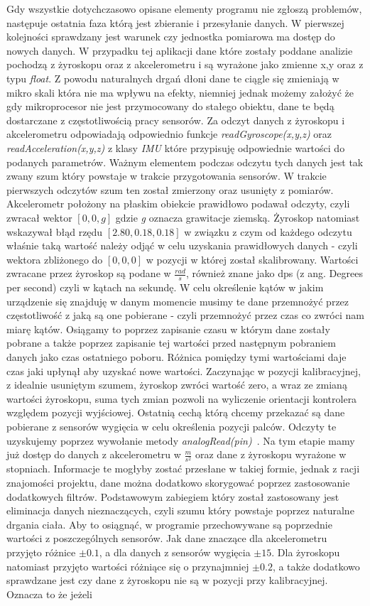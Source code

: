 Gdy wszystkie dotychczasowo opisane elementy programu nie zgłoszą problemów, następuje ostatnia faza którą jest zbieranie i przesyłanie danych. W pierwszej kolejności sprawdzany jest warunek czy jednostka pomiarowa ma dostęp do nowych danych. W przypadku tej aplikacji dane które zostały poddane analizie pochodzą z żyroskopu oraz z akcelerometru i są wyrażone jako zmienne x,y oraz z typu \textit{float}. Z powodu naturalnych drgań dłoni dane te ciągle się zmieniają w mikro skali która nie ma wpływu na efekty, niemniej jednak możemy założyć że gdy mikroprocesor nie jest przymocowany do stałego obiektu, dane te będą dostarczane z częstotliwością pracy sensorów. Za odczyt danych z żyroskopu i akcelerometru odpowiadają odpowiednio funkcje \textit{readGyroscope(x,y,z)} oraz \textit{readAcceleration(x,y,z)} z klasy \textit{IMU} które przypisuję odpowiednie wartości do podanych parametrów. Ważnym elementem podczas odczytu tych danych jest tak zwany szum który powstaje w trakcie przygotowania sensorów. W trakcie pierwszych odczytów szum ten został zmierzony oraz usunięty z pomiarów. Akcelerometr położony na płaskim obiekcie prawidłowo podawał odczyty, czyli zwracał wektor $[0,0,g]$ gdzie \textit{g} oznacza grawitacje ziemską. Żyroskop natomiast wskazywał błąd rzędu $[2.80,0.18,0.18]$ w związku  z czym od każdego odczytu właśnie taką wartość należy odjąć w celu uzyskania prawidłowych danych - czyli wektora zbliżonego do $[0,0,0]$ w pozycji w której został skalibrowany. Wartości zwracane przez żyroskop są podane w $\frac{rad}{s}$, również znane jako dps (z ang. Degrees per second) czyli w kątach na sekundę. W celu określenie kątów w jakim urządzenie się znajduję w danym momencie musimy te dane przemnożyć przez częstotliwość z jaką są one pobierane - czyli przemnożyć przez czas co zwróci nam miarę kątów. Osiągamy to poprzez zapisanie czasu w którym dane zostały pobrane a także poprzez zapisanie tej wartości przed następnym pobraniem danych jako czas ostatniego poboru. Różnica pomiędzy tymi wartościami daje czas jaki upłynął aby uzyskać nowe wartości. Zaczynając w pozycji kalibracyjnej, z idealnie usuniętym szumem, żyroskop zwróci wartość zero, a wraz ze zmianą wartości żyroskopu, suma tych zmian pozwoli na wyliczenie orientacji kontrolera względem pozycji wyjściowej. Ostatnią cechą którą chcemy przekazać są dane pobierane z sensorów wygięcia w celu określenia pozycji palców. Odczyty te uzyskujemy poprzez wywołanie metody \textit{analogRead(pin)}~\cite{ArduinoDoc}. Na tym etapie mamy już dostęp do danych z akcelerometru w {\Large $\frac{m}{s^2}$} oraz dane z żyroskopu wyrażone w stopniach. Informacje te mogłyby zostać przesłane w takiej formie, jednak z racji znajomości projektu, dane można dodatkowo skorygować poprzez zastosowanie dodatkowych filtrów. Podstawowym zabiegiem który został zastosowany jest eliminacja danych nieznaczących, czyli szumu który powstaje poprzez naturalne drgania ciała. Aby to osiągnąć, w programie przechowywane są poprzednie wartości z poszczególnych sensorów. Jak dane znaczące dla akcelerometru przyjęto różnice $\pm 0.1$, a dla danych z sensorów wygięcia $\pm 15$. Dla żyroskopu natomiast przyjęto wartości różniące się o przynajmniej $\pm 0.2$, a także dodatkowo sprawdzane jest czy dane z żyroskopu nie są w pozycji przy kalibracyjnej. Oznacza to że jeżeli 